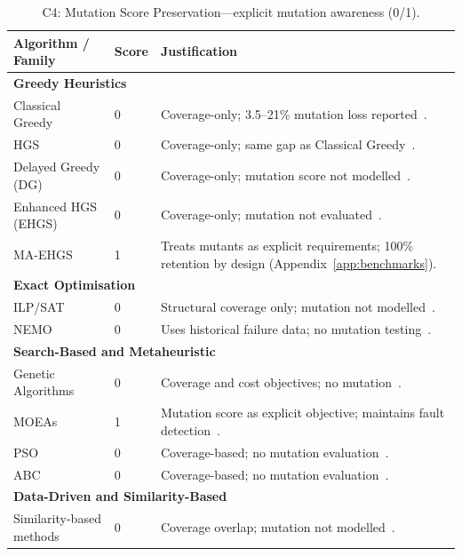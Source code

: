 \begin{appendices}
\begin{table}[H]
  \centering
  \footnotesize
  \caption{C4: Mutation Score Preservation—explicit mutation awareness (0/1).}
  \label{tab:app:c4}
  \begin{tabular}{@{}p{4.5cm}p{0.8cm}p{6.9cm}@{}}
    \toprule
    \textbf{Algorithm / Family} & \textbf{Score} & \textbf{Justification} \\
    \midrule
    \multicolumn{3}{l}{\textbf{Greedy Heuristics}} \\
    Classical Greedy & 0 & Coverage-only; 3.5--21\% mutation loss reported~\cite{noemmer2020}. \\
    HGS & 0 & Coverage-only; same gap as Classical Greedy~\cite{noemmer2020}. \\
    Delayed Greedy (DG) & 0 & Coverage-only; mutation score not modelled~\cite{jehan2023}. \\
    Enhanced HGS (EHGS) & 0 & Coverage-only; mutation not evaluated~\cite{gladston2015}. \\
    MA-EHGS & 1 & Treats mutants as explicit requirements; 100\% retention by design (Appendix~\ref{app:benchmarks}). \\[0.2em]
    \multicolumn{3}{l}{\textbf{Exact Optimisation}} \\
    ILP/SAT & 0 & Structural coverage only; mutation not modelled~\cite{elbaum2002,yoo2012}. \\
    NEMO & 0 & Uses historical failure data; no mutation testing~\cite{lin2018}. \\[0.2em]
    \multicolumn{3}{l}{\textbf{Search-Based and Metaheuristic}} \\
    Genetic Algorithms & 0 & Coverage and cost objectives; no mutation~\cite{yoo2012,khan2020}. \\
    MOEAs & 1 & Mutation score as explicit objective; maintains fault detection~\cite{wei2017}. \\
    PSO & 0 & Coverage-based; no mutation evaluation~\cite{khan2020}. \\
    ABC & 0 & Coverage-based; no mutation evaluation~\cite{khan2020}. \\[0.2em]
    \multicolumn{3}{l}{\textbf{Data-Driven and Similarity-Based}} \\
    Similarity-based methods & 0 & Coverage overlap; mutation not modelled~\cite{bach2017,khan2020}. \\
    \bottomrule
  \end{tabular}
\end{table}


\end{appendices}

